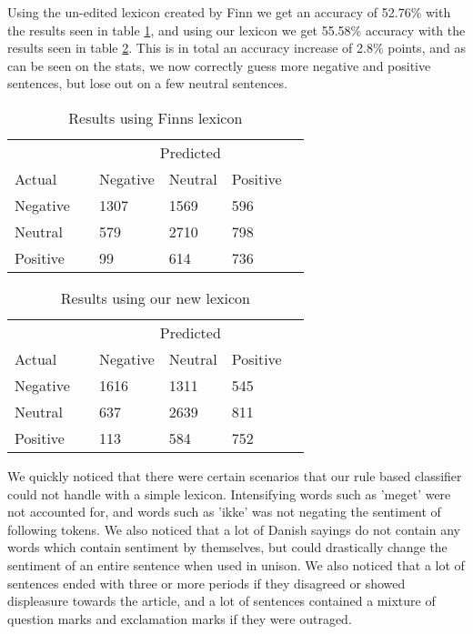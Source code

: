 Using the un-edited lexicon created by Finn we get an accuracy of 52.76\% with the results seen in table \ref{afinnresult}, and using our lexicon we get 55.58\% accuracy with the results seen in table \ref{ourlexresult}. This is in total an accuracy increase of 2.8\% points, and as can be seen on the stats, we now correctly guess more negative and positive sentences, but lose out on a few neutral sentences.

\begin{table}[H]
	\begin{tabular}{@{}llllll@{}}
		\toprule
		& & \multicolumn{3}{c}{Predicted} \\\cmidrule{3-5}
		Actual & & Negative & Neutral & Positive &  \\ \midrule
		Negative & & 1307 & 1569 & 596 & \\
		Neutral  & & 579 & 2710 & 798 & \\
		Positive & & 99 & 614 & 736 & \\ \bottomrule
	\end{tabular}
	\centering
	\caption{Results using Finns lexicon}
	\label{afinnresult}
\end{table}

\begin{table}[H]
	\begin{tabular}{@{}llllll@{}}
		\toprule
		& & \multicolumn{3}{c}{Predicted} \\\cmidrule{3-5}
		Actual & & Negative & Neutral & Positive &  \\ \midrule
		Negative & & 1616 & 1311 & 545 & \\
		Neutral  & & 637 & 2639 & 811 & \\
		Positive & & 113 & 584 & 752 & \\ \bottomrule
	\end{tabular}
	\centering
	\caption{Results using our new lexicon}
	\label{ourlexresult}
\end{table}

We quickly noticed that there were certain scenarios that our rule based classifier could not handle with a simple lexicon. Intensifying words such as 'meget' were not accounted for, and words such as 'ikke' was not negating the sentiment of following tokens. We also noticed that a lot of Danish sayings do not contain any words which contain sentiment by themselves, but could drastically change the sentiment of an entire sentence when used in unison. We also noticed that a lot of sentences ended with three or more periods if they disagreed or showed displeasure towards the article, and a lot of sentences contained a mixture of question marks and exclamation marks if they were outraged.

